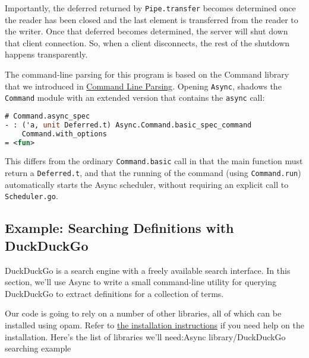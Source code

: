 Importantly, the deferred returned by
\passthrough{\lstinline!Pipe.transfer!} becomes determined once the
reader has been closed and the last element is transferred from the
reader to the writer. Once that deferred becomes determined, the server
will shut down that client connection. So, when a client disconnects,
the rest of the shutdown happens transparently.

The command-line parsing for this program is based on the Command
library that we introduced in
\href{command-line-parsing.html\#command-line-parsing}{Command Line
Parsing}. Opening \passthrough{\lstinline!Async!}, shadows the
\passthrough{\lstinline!Command!} module with an extended version that
contains the \passthrough{\lstinline!async!} call:

\begin{lstlisting}[language=Caml]
# Command.async_spec
- : ('a, unit Deferred.t) Async.Command.basic_spec_command
    Command.with_options
= <fun>
\end{lstlisting}

This differs from the ordinary \passthrough{\lstinline!Command.basic!}
call in that the main function must return a
\passthrough{\lstinline!Deferred.t!}, and that the running of the
command (using \passthrough{\lstinline!Command.run!}) automatically
starts the Async scheduler, without requiring an explicit call to
\passthrough{\lstinline!Scheduler.go!}.~~

\hypertarget{example-searching-definitions-with-duckduckgo}{%
\subsection{Example: Searching Definitions with
DuckDuckGo}\label{example-searching-definitions-with-duckduckgo}}

DuckDuckGo is a search engine with a freely available search interface.
In this section, we'll use Async to write a small command-line utility
for querying DuckDuckGo to extract definitions for a collection of
terms. 

Our code is going to rely on a number of other libraries, all of which
can be installed using opam. Refer to \href{install.html}{the
installation instructions} if you need help on the installation. Here's
the list of libraries we'll
need:\protect\hypertarget{ALduckduck}{}{Async library/DuckDuckGo
searching example}

